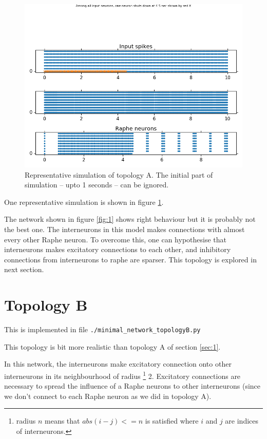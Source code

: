 \documentclass[]{article}
\begin{document}
\begin{figure}[h!]
\begin{center}
    \includegraphics[width=1\textwidth]{./_snapshots/437f1834-d269-11e5-9456-e94c7dbd7a53.png}
\end{center}

\caption{Representative simulation of topology A. The initial part of simulation
    -- upto 1 seconds -- can be ignored. }
\label{fig:simulation}
\end{figure}

One representative simulation is shown in figure \ref{fig:simulation}.

The network shown in figure \ref{fig:1} shows right behaviour  but it is
probably not the best one. The interneurons in this model makes connections with
almost every other Raphe neuron. To overcome this, one can hypothesise that
interneurons makes excitatory connections to each other, and inhibitory
connections from interneurons to raphe are sparser. This topology is explored in
next section.

\section{Topology B}
\label{sec:2}

This is implemented in file \texttt{./minimal\_network\_topologyB.py}

This topology is bit more realistic than topology A of section \ref{sec:1}.

In this network, the interneurons make excitatory connection onto other
interneurons in its neighbourhood of radius \footnote{radius $n$ means that
    $abs(i-j) <= n$ is satisfied where $i$ and $j$ are indices of interneurons.
} 2. Excitatory connections are necessary to spread the influence of a Raphe
neurons to other interneurons (since we don't connect to each Raphe neuron as we
did in topology A).
\end{document}
